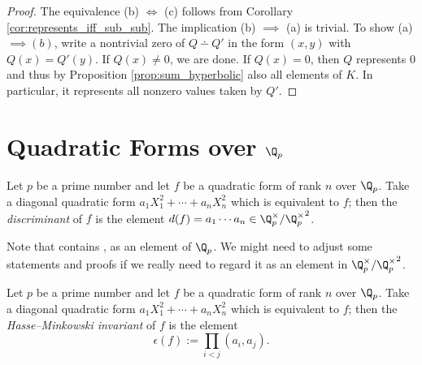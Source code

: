 \begin{proof}
The equivalence (b) $\iff$ (c) follows from Corollary \ref{cor:represents_iff_sub_sub}. The implication (b) $\implies$ (a) is trivial. To show (a) $\implies (b)$, write a nontrivial zero of $Q \dotminus Q'$ in the form $(x, y)$ with $Q(x) = Q'(y)$. If $Q(x) \ne 0$, we are done. If $Q(x) = 0$, then $Q$ represents $0$ and thus by Proposition \ref{prop:sum_hyperbolic} also all elements of $K$. In particular, it represents all nonzero values taken by $Q'$. 
\end{proof}

\section[Quadratic Forms over the p-adics]{Quadratic Forms over $\Q_p$}\label{sec:quadratic_form_padic}

\begin{definition}\label{def:discr}
\mathlibok 
{}
Let $p$ be a prime number and let $f$ be a quadratic form of rank $n$ over $\Q_p$. Take a diagonal quadratic form $a_1X_1^2 + \cdots + a_nX_n^2$ which is equivalent to $f$; then the \emph{discriminant} of $f$ is the element $d(f) = a_1 \cdots a_n \in \Q_p^\times/{\Q_p^\times}^2$.
	
Note that \mathlib contains , as an element of $\Q_p$. We might need to adjust some statements and proofs if we really need to regard it as an element in $\Q_p^\times/{\Q_p^\times}^2$.
\end{definition}

\begin{definition}\label{def:HM_inv}
\leanok
Let $p$ be a prime number and let $f$ be a quadratic form of rank $n$ over $\Q_p$. Take a diagonal quadratic form $a_1X_1^2 + \cdots + a_nX_n^2$ which is equivalent to $f$; then the \emph{Hasse--Minkowski invariant} of $f$ is the element
\[ \epsilon(f) := \prod_{i < j}(a_i, a_j).\]
\end{definition}

